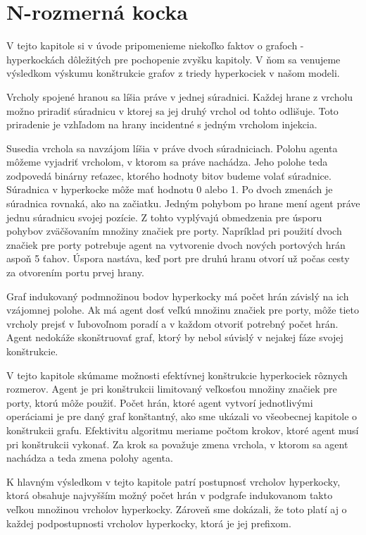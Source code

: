 
\chapter{N-rozmerná kocka}
V tejto kapitole si v úvode pripomenieme niekoľko faktov o grafoch - 
hyperkockách dôležitých pre pochopenie zvyšku kapitoly. V ňom sa venujeme
výsledkom výskumu konštrukcie grafov z triedy hyperkociek v našom modeli.

Vrcholy spojené hranou sa líšia práve v jednej súradnici. Každej hrane z
vrcholu možno priradiť súradnicu v ktorej sa jej druhý vrchol od tohto
odlišuje. Toto priradenie je vzhľadom na hrany incidentné s jedným vrcholom
 injekcia.

Susedia vrchola sa navzájom líšia v práve dvoch súradniciach. Polohu agenta
môžeme vyjadriť vrcholom, v ktorom sa práve nachádza. Jeho polohe teda
zodpovedá
binárny reťazec, ktorého hodnoty bitov budeme volať súradnice. Súradnica v
hyperkocke môže mať hodnotu 0 alebo 1. Po dvoch zmenách je súradnica
rovnaká, ako na začiatku.
 Jedným pohybom po hrane mení agent práve jednu súradnicu svojej pozície. 
Z tohto vyplývajú obmedzenia
pre úsporu pohybov zväčšovaním množiny značiek pre porty. 
Napríklad pri použití dvoch
značiek pre porty potrebuje agent na vytvorenie dvoch nových portových hrán
aspoň 5 ťahov. Úspora nastáva, keď port pre druhú hranu otvorí už počas
cesty za otvorením portu prvej hrany.

Graf indukovaný podmnožinou bodov hyperkocky má počet hrán závislý na ich
vzájomnej polohe. Ak má agent dosť veľkú množinu značiek pre porty, môže
tieto vrcholy prejsť v ľubovoľnom poradí a v každom otvoriť potrebný počet
hrán. Agent nedokáže skonštruovať graf, ktorý by nebol súvislý v nejakej
fáze svojej konštrukcie.

V tejto kapitole skúmame možnosti efektívnej konštrukcie hyperkociek rôznych
rozmerov. Agent je pri konštrukcii limitovaný veľkosťou množiny značiek pre
porty, ktorú môže použiť. Počet hrán, ktoré agent vytvorí jednotlivými
operáciami je pre daný graf konštantný, ako sme ukázali vo všeobecnej kapitole o
konštrukcii grafu. Efektivitu algoritmu meriame počtom krokov, ktoré agent
musí pri konštrukcii vykonať. Za krok sa považuje zmena vrchola, v ktorom sa
agent nachádza a teda zmena polohy agenta.

K hlavným výsledkom v tejto kapitole patrí postupnosť vrcholov hyperkocky, 
ktorá
obsahuje najvyšším možný počet hrán v podgrafe indukovanom takto veľkou
množinou vrcholov hyperkocky. Zároveň sme dokázali, že toto platí aj o každej
podpostupnosti vrcholov hyperkocky, ktorá je jej prefixom.

